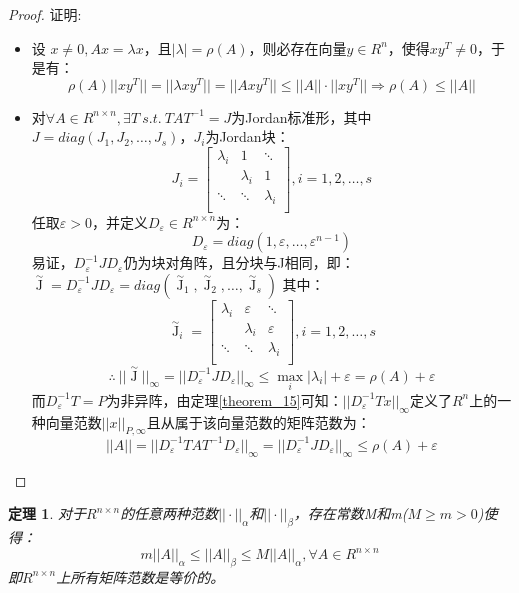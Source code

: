 \documentclass[a4paper]{article}
\newtheorem{theorem}{定理}[section]
\begin{document}
\begin{proof}
证明:\\
\begin{itemize}
\item 设 $x \neq 0, Ax=\lambda x$，且$|\lambda| = \rho (A)$，则必存在向量$y\in R^n$，使得$xy^T\neq 0$，于是有：
$$\rho(A)||xy^T|| = ||\lambda xy^T|| = ||Axy^T|| \le ||A||\cdot ||xy^T|| \Rightarrow \rho(A) \le ||A||$$
\item 对$\forall A \in R^{n\times n}, \exists T \ s.t. \ TAT^{-1}=J$为Jordan标准形，其中$J=diag(J_1, J_2, \dots, J_s)$，$J_i$为Jordan块：
$$J_i = \left[
\begin{matrix}
\lambda_i &  1 & \ddots\\
~ & \lambda_i & 1  \\
\ddots & \ddots & \lambda_i \\
\end{matrix}
\right], i=1, 2, \dots, s
$$
任取$\varepsilon > 0$，并定义$D_\varepsilon \in R^{n\times n}$为：
$$D_\varepsilon = diag(1, \varepsilon, \dots,\varepsilon^{n-1})$$
易证，$D^{-1}_{\varepsilon}JD_{\varepsilon}$仍为块对角阵，且分块与J相同，即：$ \mathop J\limits^{\sim}=D^{-1}_\varepsilon J D_\varepsilon = diag({\mathop J\limits^{\sim}}_1, {\mathop J\limits^{\sim}}_2, \dots, {\mathop J\limits^{\sim}}_s)$
其中：\\
$${\mathop J\limits^{\sim}}_i = \left[
\begin{matrix}
\lambda_i &  \varepsilon & \ddots\\
~ & \lambda_i & \varepsilon \\
\ddots & \ddots & \lambda_i \\
\end{matrix}
\right], i=1, 2, \dots, s
$$
$$\therefore \  ||{\mathop J\limits^{\sim}}||_\infty = ||D^{-1}_\varepsilon JD_\varepsilon||_\infty \le \max_i |\lambda_i|+\varepsilon = \rho(A)+\varepsilon$$
而$D^{-1}_\varepsilon T=P$为非异阵，由定理\ref{theorem_15}可知：$||D_\varepsilon^{-1}Tx||_\infty$定义了$R^n$上的一种向量范数$||x||_{P, \infty}$且从属于该向量范数的矩阵范数为：
$$||A||=||D^{-1}_\varepsilon TAT^{-1}D_\varepsilon ||_\infty=||D^{-1}_\varepsilon J D_\varepsilon||_\infty \le \rho(A) + \varepsilon$$
\end{itemize}
\end{proof}

\begin{theorem}
对于$R^{n\times n}$的任意两种范数$||\cdot||_\alpha$和$||\cdot||_\beta$，存在常数M和m($M\ge m > 0$)使得：
$$m||A||_\alpha \le ||A||_\beta \le M||A||_\alpha, \forall A \in R^{n\times n}$$
即$R^{n\times n}$上所有矩阵范数是等价的。
\end{theorem}
\end{document}
